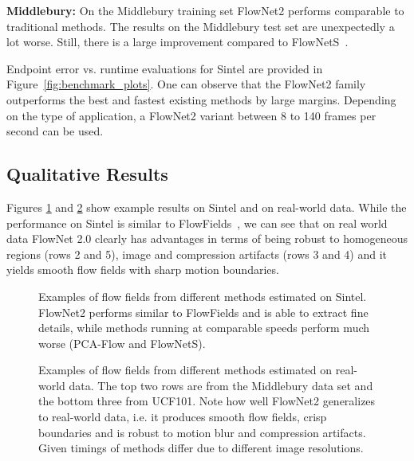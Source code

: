 \documentclass[10pt,twocolumn,letterpaper]{article}%
\begin{document}
\textbf{Middlebury:} On the Middlebury training set FlowNet2 performs comparable to traditional methods. The results on the Middlebury test set are unexpectedly a lot worse. Still, there is a large improvement compared to FlowNetS~\cite{DFIB15}. 

Endpoint error vs. runtime evaluations for Sintel are provided in Figure~\ref{fig:benchmark_plots}. One can observe that the FlowNet2 family outperforms the best and fastest existing methods by large margins. Depending on the type of application, a FlowNet2 variant between 8 to 140 frames per second can be used. 

\subsection{Qualitative Results}

Figures \ref{fig:gallery_sintel} and \ref{fig:gallery_other} show example results on Sintel and on real-world data. While the performance on Sintel is similar to FlowFields~\cite{flowfields}, we can see that on real world data FlowNet 2.0 clearly has advantages in terms of being robust to homogeneous regions (rows 2 and 5), image and compression artifacts (rows 3 and 4) and it yields smooth flow fields with sharp motion boundaries. 

\newcommand{\galleryWidth}{0.165\linewidth}%

%      

\begin{figure}[t]
  \begin{center}%
     
  \end{center}%
  \caption{Examples of flow fields from different methods estimated on Sintel. FlowNet2 performs similar to FlowFields and is able to extract fine details, while methods running at comparable speeds perform much worse (PCA-Flow and FlowNetS).}%
  \label{fig:gallery_sintel}%
\end{figure}

\begin{figure}[t]
  \begin{center}%
     
  \end{center}%
  \caption{Examples of flow fields from different methods estimated on real-world data. The top two rows are from the Middlebury data set and the bottom three from UCF101. Note how well FlowNet2 generalizes to real-world data, i.e. it produces smooth flow fields, crisp boundaries and is robust to motion blur and compression artifacts. Given timings of methods differ due to different image resolutions.}%
  \label{fig:gallery_other}%
  \vspace*{-0.5mm}
\end{figure}
\end{document}
